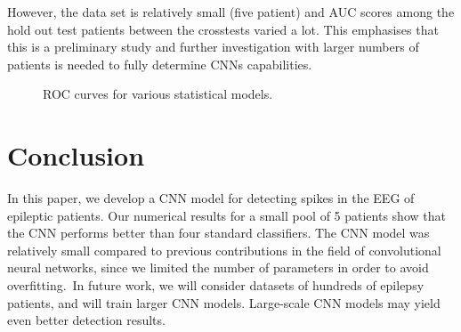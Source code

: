 \documentclass{article}
\begin{document}
However, the data set is relatively small (five patient) and AUC scores among the hold out test patients between the crosstests varied a lot. This emphasises that this is a preliminary study and further investigation with larger numbers of patients is needed to fully determine CNNs capabilities.

\begin{figure}[htb]
    \centering
    \setlength\fboxsep{0pt}
    \setlength{}
    \caption{ROC curves for various statistical models.}
    \label{fig:ROC}
\end{figure}

\section{Conclusion}

In this paper, we develop a CNN model for detecting spikes in the EEG of epileptic patients.
Our numerical results for a small pool of 5 patients show that the CNN performs better than four standard classifiers.
The CNN model was relatively small compared to previous contributions in the field of convolutional neural networks, since we limited the number of parameters in order to avoid overfitting.~In future work, we will consider datasets of hundreds of epilepsy patients, and will train larger CNN models. Large-scale CNN models may yield even better detection results.



\end{document}
